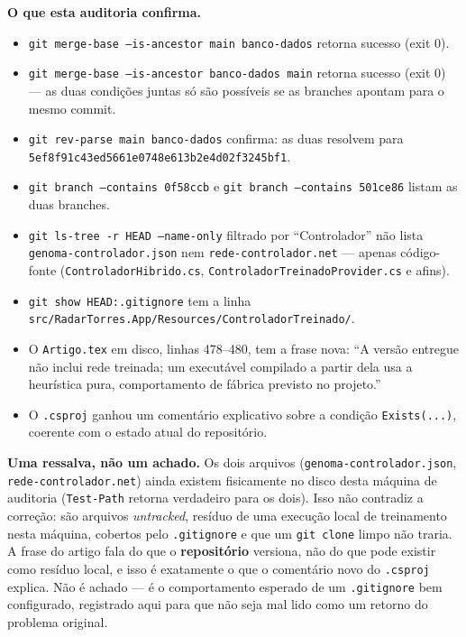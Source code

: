 \documentclass[11pt,a4paper]{article}
\begin{document}
\textbf{O que esta auditoria confirma.}
\begin{itemize}
  \item \texttt{git merge-base --is-ancestor main banco-dados} retorna sucesso (exit 0).
  \item \texttt{git merge-base --is-ancestor banco-dados main} retorna sucesso (exit 0) --- as duas
  condições juntas só são possíveis se as branches apontam para o mesmo commit.
  \item \texttt{git rev-parse main banco-dados} confirma: as duas resolvem para
  \texttt{5ef8f91c43ed5661e0748e613b2e4d02f3245bf1}.
  \item \texttt{git branch --contains 0f58ccb} e \texttt{git branch --contains 501ce86} listam as duas
  branches.
  \item \texttt{git ls-tree -r HEAD --name-only} filtrado por ``Controlador'' não lista
  \texttt{genoma-controlador.json} nem \texttt{rede-controlador.net} --- apenas código-fonte
  (\texttt{ControladorHibrido.cs}, \texttt{ControladorTreinadoProvider.cs} e afins).
  \item \texttt{git show HEAD:.gitignore} tem a linha
  \texttt{src/RadarTorres.App/Resources/ControladorTreinado/}.
  \item O \texttt{Artigo.tex} em disco, linhas 478--480, tem a frase nova: ``A versão entregue não
  inclui rede treinada; um executável compilado a partir dela usa a heurística pura, comportamento de
  fábrica previsto no projeto.''
  \item O \texttt{.csproj} ganhou um comentário explicativo sobre a condição \texttt{Exists(...)},
  coerente com o estado atual do repositório.
\end{itemize}

\textbf{Uma ressalva, não um achado.} Os dois arquivos (\texttt{genoma-controlador.json},
\texttt{rede-controlador.net}) ainda existem fisicamente no disco desta máquina de auditoria
(\texttt{Test-Path} retorna verdadeiro para os dois). Isso não contradiz a correção: são arquivos
\textit{untracked}, resíduo de uma execução local de treinamento nesta máquina, cobertos pelo
\texttt{.gitignore} e que um \texttt{git clone} limpo não traria. A frase do artigo fala do que o
\textbf{repositório} versiona, não do que pode existir como resíduo local, e isso é exatamente o que o
comentário novo do \texttt{.csproj} explica. Não é achado --- é o comportamento esperado de um
\texttt{.gitignore} bem configurado, registrado aqui para que não seja mal lido como um retorno do
problema original.
\end{document}
